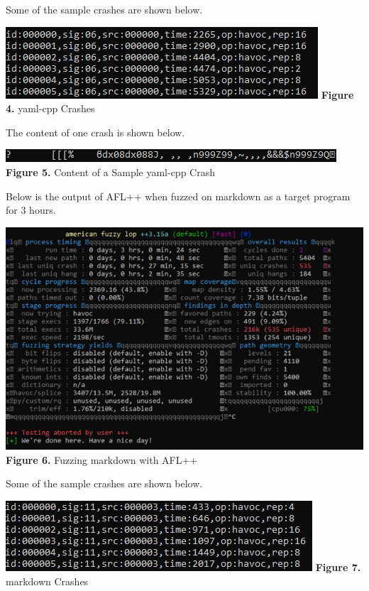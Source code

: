\documentclass[12pt]{diazessay}
\begin{document}
Some of the sample crashes are shown below.

\begin{center}
    \includegraphics[scale=0.4, trim={0 3cm 0 0}, clip]{yaml sample crashes.png}
    \textbf{Figure 4.} yaml-cpp Crashes 
\end{center}

The content of one crash is shown below.

\begin{center}
    \includegraphics[scale=0.4, trim={0 3cm 0 0}, clip]{yamlsamplecrashcat.png}
    \textbf{Figure 5.} Content of a Sample yaml-cpp Crash
\end{center}

Below is the output of AFL++ when fuzzed on markdown as a target program for 3 hours.

\begin{center}
    \includegraphics[scale=0.4, trim={0 3cm 0 0}, clip]{markdownfuzzer.png}
    \textbf{Figure 6.} Fuzzing markdown with AFL++
\end{center}

Some of the sample crashes are shown below.

\begin{center}
    \includegraphics[scale=0.4, trim={0 3cm 0 0}, clip]{markdowncrashes.png}
    \textbf{Figure 7.} markdown Crashes
\end{center}
\end{document}
